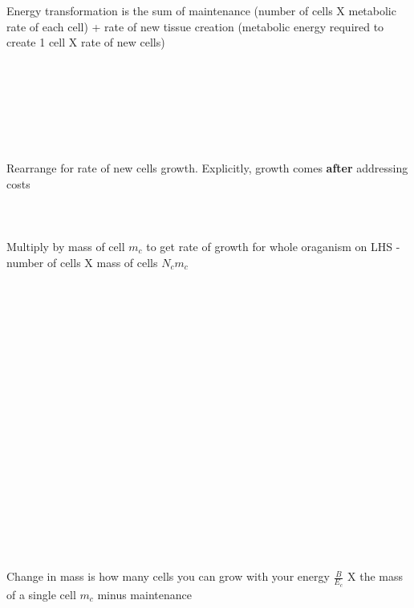 \documentclass[a4paper]{article} %
\begin{document}
Energy transformation is the sum of maintenance (number of cells X metabolic rate of each cell) + rate of new tissue creation (metabolic energy required to create 1 cell X rate of new cells) \\ \\ \\ \\ \\ \\ \\ \\
Rearrange for rate of new cells growth. Explicitly, growth comes \textbf{after} addressing costs \\ \\ \\ \\
Multiply by mass of cell $m_{c}$ to get rate of growth for whole oraganism on LHS - number of cells X mass of cells $N_{c}m_{c}$ \\ \\ \\ \\ \\ \\ \\ \\ \\ \\ \\ \\ \\ \\ \\ \\ \\ \\ \\ \\
Change in mass is how many cells you can grow with your energy $\frac{B}{E_c}$ X the mass of a single cell $m_c$ minus maintenance 

\let\mkbibnamefamily\textsc\printbibliography[title=Bibliography]\thispagestyle{empty} %
\end{document}
